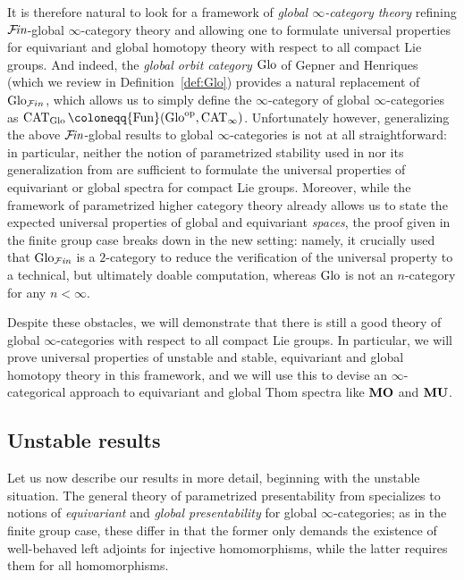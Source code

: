 \documentclass[reqno]{memo-l}
\theoremstyle{mythm}
\theoremstyle{definition}
\numberwithin{equation}{section}
\newcommand{\Ff}{{\mathcal{F}}}
\DeclareMathOperator{\CAT}{CAT}
\newcommand{\Fun}{{\textup{Fun}}}
\newcommand{\cat}[1]{\textbf{\textup{#1}}}
\newcommand{\op}{{\textup{op}}}
\newcommand{\Fin}{\hbox{$\mathcal F\kern-1.7pt\textit{in}$}}
\newcommand{\Glo}{\textup{Glo}}
\begin{document}
It is therefore natural to look for a framework of \emph{global $\infty$-category theory} refining $\Fin$-global $\infty$-category theory and allowing one to formulate universal properties for equivariant and global homotopy theory with respect to all compact Lie groups. And indeed, the \emph{global orbit category} $\Glo$ of Gepner and Henriques \cite{gepnerhenriques2007orbispaces} (which we review in Definition~\ref{def:Glo}) provides a natural replacement of $\Glo_{\Ff\kern-.4ptin}$, which allows us to simply define the $\infty$-category of global $\infty$-categories as $\CAT_{\Glo}\coloneqq \Fun(\Glo^{\op},\CAT_{\infty})$.  Unfortunately however, generalizing the above $\Fin$-global results to global $\infty$-categories is not at all straightforward: in particular, neither the notion of parametrized stability used in \cite{CLL_Global} nor its generalization from \cite{CLL_Spans} are sufficient to formulate the universal properties of equivariant or global spectra for compact Lie groups. Moreover, while the framework of parametrized higher category theory already allows us to state the expected universal properties of global and equivariant \emph{spaces}, the proof given in the finite group case breaks down in the new setting: namely, it crucially used that $\Glo_{\Ff\kern-.4pt\textit{in}}$ is a $2$-category to reduce the verification of the universal property to a technical, but ultimately doable computation, whereas $\Glo$ is not an $n$-category for any $n<\infty$.

Despite these obstacles, we will demonstrate that there is still a good theory of global $\infty$-categories with respect to all compact Lie groups. In particular, we will prove universal properties of unstable and stable, equivariant and global homotopy theory in this framework, and we will use this to devise an $\infty$-categorical approach to equivariant and global Thom spectra like $\cat{MO}$ and $\cat{MU}$.

\subsection*{Unstable results} Let us now describe our results in more detail, beginning with the unstable situation. The general theory of parametrized presentability from \cites{martiniwolf2022presentable,CLL_Clefts} specializes to notions of \emph{equivariant} and \emph{global presentability} for global $\infty$-categories; as in the finite group case, these differ in that the former only demands the existence of well-behaved left adjoints for injective homomorphisms, while the latter requires them for all homomorphisms. 
\end{document}
